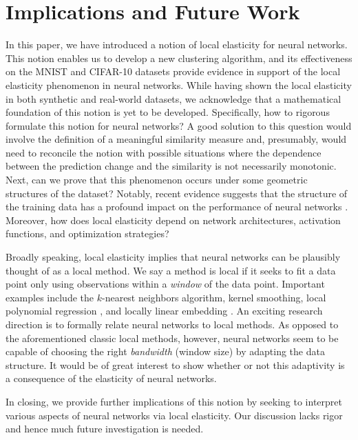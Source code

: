 \section{Implications and Future Work}\label{sec:conclusion}
In this paper, we have introduced a notion of local elasticity for neural networks. This notion enables us to develop a new clustering algorithm, and its effectiveness on the MNIST and CIFAR-10 datasets provide evidence in support of the local elasticity phenomenon in neural networks. While having shown the local elasticity in both synthetic and real-world datasets, we acknowledge that a mathematical foundation of this notion is yet to be developed. Specifically, how to rigorous formulate this notion for neural networks? A good solution to this question would involve the definition of a meaningful similarity measure and, presumably, would need to reconcile the notion with possible situations where the dependence between the prediction change and the similarity is not necessarily
monotonic. Next, can we prove that this phenomenon occurs under some geometric structures of the dataset? Notably, recent evidence suggests that the structure of the training data has a profound impact on the performance of neural networks \citep{Modellingtheinfluence}. Moreover, how does local elasticity depend on network architectures, activation functions, and optimization strategies?

Broadly speaking, local elasticity implies that neural networks can be plausibly thought of as a local method. We say a method is local if it seeks to fit a data point only using observations within a \textit{window} of the data point. Important examples include the $k$-nearest neighbors algorithm, kernel smoothing, local polynomial regression \citep{fan2018local}, and locally linear embedding \citep{roweis2000nonlinear}. An exciting research direction is to formally relate neural networks to local methods. As opposed to the aforementioned classic local methods, however, neural networks seem to be capable of choosing the right \textit{bandwidth} (window size) by adapting the data structure. It would be of great interest to show whether or not this adaptivity is a consequence of the elasticity of neural networks.

In closing, we provide further implications of this notion by seeking to interpret various aspects of neural networks via local elasticity. Our discussion lacks rigor and hence much future investigation is needed.

